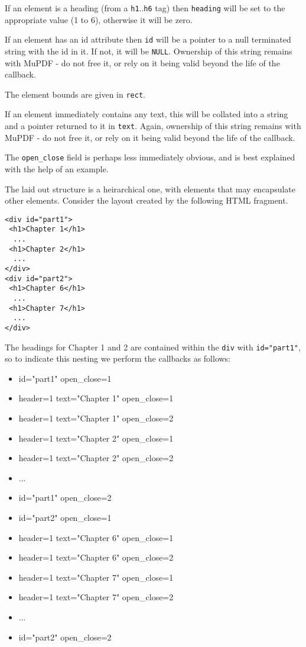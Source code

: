\documentclass[oneside]{book}
\begin{document}
If an element is a heading (from a \texttt{h1}..\texttt{h6} tag) then \texttt{heading} will be set to the appropriate value (1 to 6), otherwise it will be zero.

If an element has an id attribute then \texttt{id} will be a pointer to a null terminated string with the id in it. If not, it will be \texttt{NULL}. Ownership of this string remains with MuPDF - do not free it, or rely on it being valid beyond the life of the callback.

The element bounds are given in \texttt{rect}.

If an element immediately contains any text, this will be collated into a string and a pointer returned to it in \texttt{text}. Again, ownership of this string remains with MuPDF - do not free it, or rely on it being valid beyond the life of the callback.

The \texttt{open\_close} field is perhaps less immediately obvious, and is best explained with the help of an example.

The laid out structure is a heirarchical one, with elements that may encapsulate other elements. Consider the layout created by the following HTML fragment.

\begin{lstlisting}
<div id="part1">
 <h1>Chapter 1</h1>
  ...
 <h1>Chapter 2</h1>
  ...
</div>
<div id="part2">
 <h1>Chapter 6</h1>
  ...
 <h1>Chapter 7</h1>
  ...
</div>
\end{lstlisting}

The headings for Chapter 1 and 2 are contained within the \texttt{div} with \texttt{id="part1"}, so to indicate this nesting we perform the callbacks as follows:

\begin{itemize}
\item id="part1" open\_close=1
\item header=1 text="Chapter 1" open\_close=1
\item header=1 text="Chapter 1" open\_close=2
\item header=1 text="Chapter 2" open\_close=1
\item header=1 text="Chapter 2" open\_close=2
\item ...
\item id="part1" open\_close=2
\item id="part2" open\_close=1
\item header=1 text="Chapter 6" open\_close=1
\item header=1 text="Chapter 6" open\_close=2
\item header=1 text="Chapter 7" open\_close=1
\item header=1 text="Chapter 7" open\_close=2
\item ...
\item id="part2" open\_close=2
\end{itemize}
\end{document}
